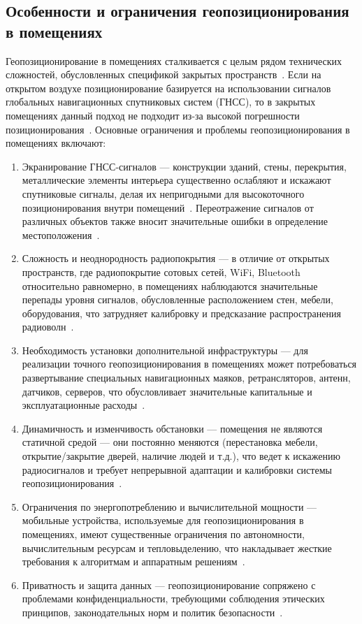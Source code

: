 \subsection{Особенности и ограничения геопозиционирования в помещениях}

Геопозиционирование в помещениях сталкивается с целым рядом технических сложностей, обусловленных спецификой закрытых пространств~\cite{basebook}. Если на открытом воздухе позиционирование базируется на использовании сигналов глобальных навигационных спутниковых систем (ГНСС), то в закрытых помещениях данный подход не подходит из-за высокой погрешности позиционирования~\cite{intro}. Основные ограничения и проблемы геопозиционирования в помещениях включают:

\begin{enumerate}
    \item Экранирование ГНСС-сигналов --- конструкции зданий, стены, перекрытия, металлические элементы интерьера существенно ослабляют и искажают спутниковые сигналы, делая их непригодными для высокоточного позиционирования внутри помещений~\cite{shielding}. Переотражение сигналов от различных объектов также вносит значительные ошибки в определение местоположения~\cite{shielding}.
    \item Сложность и неоднородность радиопокрытия --- в отличие от открытых пространств, где радиопокрытие сотовых сетей, WiFi, Bluetooth относительно равномерно, в помещениях наблюдаются значительные перепады уровня сигналов, обусловленные расположением стен, мебели, оборудования, что затрудняет калибровку и предсказание распространения радиоволн~\cite{heterogenity}.
    \item Необходимость установки дополнительной инфраструктуры --- для реализации точного геопозиционирования в помещениях может потребоваться развертывание специальных навигационных маяков, ретрансляторов, антенн, датчиков, серверов, что обусловливает значительные капитальные и эксплуатационные расходы~\cite{basebook}.
    \item Динамичность и изменчивость обстановки --- помещения не являются статичной средой --- они постоянно меняются (перестановка мебели, открытие/закрытие дверей, наличие людей и т.д.), что ведет к искажению радиосигналов и требует непрерывной адаптации и калибровки системы геопозиционирования~\cite{adaptation}.
    \item Ограничения по энергопотреблению и вычислительной мощности --- мобильные устройства, используемые для геопозиционирования в помещениях, имеют существенные ограничения по автономности, вычислительным ресурсам и тепловыделению, что накладывает жесткие требования к алгоритмам и аппаратным решениям~\cite{econsumption}.
    \item Приватность и защита данных --- геопозиционирование сопряжено с проблемами конфиденциальности, требующими соблюдения этических принципов, законодательных норм и политик безопасности~\cite{privacy}.
\end{enumerate}

